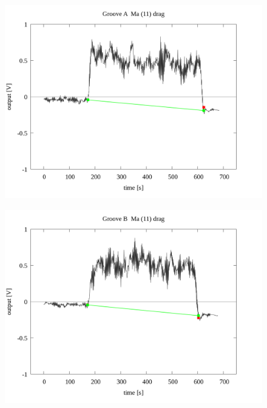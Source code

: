 \documentclass[a4paper]{jsarticle}
\begin{document}
\begin{figure}[htbp]
    \footnotesize
    \begin{center}
        \includegraphics[width=140mm]{../../../../33_result/210806/moving_average/11/drag/03/Groove_A_ma(11)_drag_03.png}
    \end{center}
\end{figure}

\begin{figure}[htbp]
    \footnotesize
    \begin{center}
        \includegraphics[width=140mm]{../../../../33_result/210806/moving_average/11/drag/03/Groove_B_ma(11)_drag_03.png}
    \end{center}
\end{figure}
\end{document}

